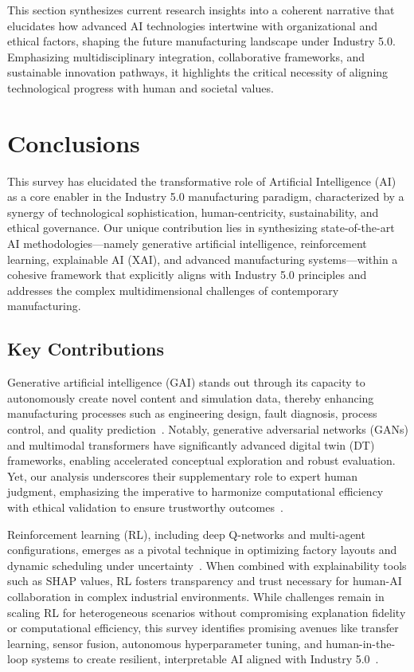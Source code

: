 \documentclass[sigconf]{acmart}
\begin{document}
This section synthesizes current research insights into a coherent narrative that elucidates how advanced AI technologies intertwine with organizational and ethical factors, shaping the future manufacturing landscape under Industry 5.0. Emphasizing multidisciplinary integration, collaborative frameworks, and sustainable innovation pathways, it highlights the critical necessity of aligning technological progress with human and societal values.

\section{Conclusions}

This survey has elucidated the transformative role of Artificial Intelligence (AI) as a core enabler in the Industry 5.0 manufacturing paradigm, characterized by a synergy of technological sophistication, human-centricity, sustainability, and ethical governance. Our unique contribution lies in synthesizing state-of-the-art AI methodologies—namely generative artificial intelligence, reinforcement learning, explainable AI (XAI), and advanced manufacturing systems—within a cohesive framework that explicitly aligns with Industry 5.0 principles and addresses the complex multidimensional challenges of contemporary manufacturing.

\subsection{Key Contributions}

Generative artificial intelligence (GAI) stands out through its capacity to autonomously create novel content and simulation data, thereby enhancing manufacturing processes such as engineering design, fault diagnosis, process control, and quality prediction~\cite{ref1,ref5,ref24}. Notably, generative adversarial networks (GANs) and multimodal transformers have significantly advanced digital twin (DT) frameworks, enabling accelerated conceptual exploration and robust evaluation. Yet, our analysis underscores their supplementary role to expert human judgment, emphasizing the imperative to harmonize computational efficiency with ethical validation to ensure trustworthy outcomes~\cite{ref2,ref6,ref14}.

Reinforcement learning (RL), including deep Q-networks and multi-agent configurations, emerges as a pivotal technique in optimizing factory layouts and dynamic scheduling under uncertainty~\cite{ref5,ref30}. When combined with explainability tools such as SHAP values, RL fosters transparency and trust necessary for human-AI collaboration in complex industrial environments. While challenges remain in scaling RL for heterogeneous scenarios without compromising explanation fidelity or computational efficiency, this survey identifies promising avenues like transfer learning, sensor fusion, autonomous hyperparameter tuning, and human-in-the-loop systems to create resilient, interpretable AI aligned with Industry 5.0~\cite{ref5,ref30,ref35,ref36}.
\end{document}
